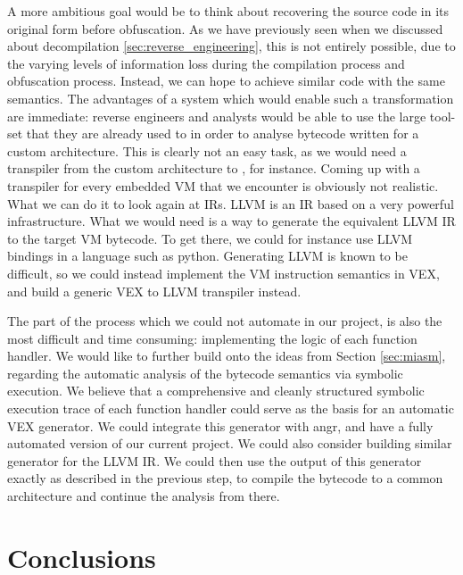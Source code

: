 A more ambitious goal would be to think about recovering the source code in its original form before obfuscation. As we have previously seen when we discussed about decompilation \ref{sec:reverse_engineering}, this is not entirely possible, due to the varying levels of information loss during the compilation process and obfuscation process. Instead, we can hope to achieve similar code with the same semantics. The advantages of a system which would enable such a transformation are immediate: reverse engineers and analysts would be able to use the large tool-set that they are already used to in order to analyse bytecode written for a custom architecture. This is clearly not an easy task, as we would need a transpiler from the custom architecture to , for instance. Coming up with a transpiler for every embedded \gls{VM} that we encounter is obviously not realistic. What we can do it to look again at \glspl{IR}. LLVM \cite{llvm} is an \gls{IR} based on a very powerful infrastructure. What we would need is a way to generate the equivalent LLVM \gls{IR} to the target \gls{VM} bytecode. To get there, we could for instance use LLVM bindings in a language such as python. Generating LLVM is known to be difficult, so we could instead implement the \gls{VM} instruction semantics in VEX, and build a generic VEX to LLVM transpiler instead.

The part of the process which we could not automate in our project, is also the most difficult and time consuming: implementing the logic of each function handler. We would like to further build onto the ideas from Section \ref{sec:miasm}, regarding the automatic analysis of the bytecode semantics via symbolic execution. We believe that a comprehensive and cleanly structured symbolic execution trace of each function handler could serve as the basis for an automatic VEX generator. We could integrate this generator with angr, and have a fully automated version of our current project. We could also consider building similar generator for the LLVM \gls{IR}. We could then use the output of this generator exactly as described in the previous step, to compile the bytecode to a common architecture and continue the analysis from there.

\chapter{Conclusions}



